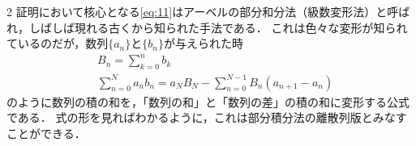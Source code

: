 \documentclass[../../main.tex]{subfiles}
\begin{document}
\begin{multicols}{2}
  証明において核心となる\cref{eq:11}はアーベルの部分和分法（級数変形法）と呼ばれ，しばしば現れる古くから知られた手法である．
  これは色々な変形が知られているのだが，数列$\{a_n\}$と$\{b_n\}$が与えられた時
  \begin{align}
    & B_n = \sum_{k=0}^{n}b_k                                              \\
    & \sum_{n=0}^{N} a_nb_n = a_N B_N - \sum_{n=0}^{N-1}B_n(a_{n+1}-a_{n})
  \end{align}
  のように数列の積の和を，「数列の和」と「数列の差」の積の和に変形する公式である．
  式の形を見ればわかるように，これは部分積分法の離散列版とみなすことができる．



  \newpage
\end{multicols}
\end{document}
